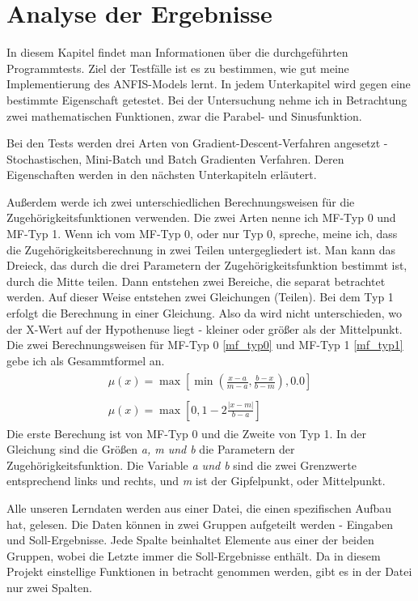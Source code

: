 \chapter{Analyse der Ergebnisse}

In diesem Kapitel findet man Informationen über die durchgeführten Programmtests. Ziel der Testfälle ist es zu bestimmen, wie gut meine Implementierung des ANFIS-Models lernt. In jedem Unterkapitel wird gegen eine bestimmte Eigenschaft getestet. Bei der Untersuchung nehme ich in Betrachtung zwei mathematischen Funktionen, zwar die Parabel- und Sinusfunktion. 

Bei den Tests werden drei Arten von Gradient-Descent-Verfahren angesetzt - Stochastischen, Mini-Batch und Batch Gradienten Verfahren. Deren Eigenschaften werden in den nächsten Unterkapiteln erläutert. 

Außerdem werde ich zwei unterschiedlichen Berechnungsweisen für die Zugehörigkeitsfunktionen verwenden. Die zwei Arten nenne ich MF-Typ 0 und MF-Typ 1. Wenn ich vom MF-Typ 0, oder nur Typ 0, spreche, meine ich, dass die Zugehörigkeitsberechnung in zwei Teilen untergegliedert ist. Man kann das Dreieck, das durch die drei Parametern der Zugehörigkeitsfunktion bestimmt ist, durch die Mitte teilen. Dann entstehen zwei Bereiche, die separat betrachtet werden. Auf dieser Weise entstehen zwei Gleichungen (Teilen). Bei dem Typ 1 erfolgt die Berechnung in einer Gleichung. Also da wird nicht unterschieden, wo der X-Wert auf der Hypothenuse liegt - kleiner oder größer als der Mittelpunkt. Die zwei Berechnungsweisen für MF-Typ 0 \ref{mf_typ0} und MF-Typ 1 \ref{mf_typ1} gebe ich als Gesammtformel an.
\begin{align}
	\begin{split}\label{mf_typ0}
		\mu(x) = \max[\min(\frac{x - a}{m - a}, \frac{b - x}{b - m}), 0.0]
	\end{split}\\
	\begin{split}\label{mf_typ1} 
		\mu(x) = \max[0, 1 - 2\frac{\lvert x - m\rvert}{b - a}]
	\end{split} 
\end{align}
Die erste Berechung ist von MF-Typ 0 und die Zweite von Typ 1. In der Gleichung sind die Größen \textit{a, m und b} die Parametern der Zugehörigkeitsfunktion. Die Variable \textit{a und b} sind die zwei Grenzwerte entsprechend links und rechts, und \textit{m} ist der Gipfelpunkt, oder Mittelpunkt.

Alle unseren Lerndaten werden aus einer Datei, die einen spezifischen Aufbau hat, gelesen. Die Daten können in zwei Gruppen aufgeteilt werden - Eingaben und Soll-Ergebnisse. Jede Spalte beinhaltet Elemente aus einer der beiden Gruppen, wobei die Letzte immer die Soll-Ergebnisse enthält. Da in diesem Projekt einstellige Funktionen in betracht genommen werden, gibt es in der Datei nur zwei Spalten.

